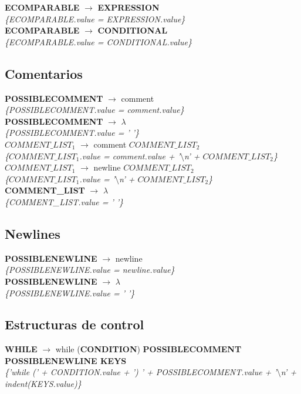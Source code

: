 \documentclass[10pt,a4paper]{article}
\begin{document}
\textbf{ECOMPARABLE} $\rightarrow$ \textbf{EXPRESSION} \\
\textit{\{ECOMPARABLE.value = EXPRESSION.value\}} \\

\textbf{ECOMPARABLE} $\rightarrow$ \textbf{CONDITIONAL} \\
\textit{\{ECOMPARABLE.value = CONDITIONAL.value\}} \\


\subsection{Comentarios}

\textbf{POSSIBLECOMMENT} $\rightarrow$ comment \\
\textit{\{POSSIBLECOMMENT.value = comment.value\}} \\

\textbf{POSSIBLECOMMENT} $\rightarrow$ $\lambda$ \\
\textit{\{POSSIBLECOMMENT.value = ' '\}} \\

\textbf{$COMMENT\_LIST_{1}$} $\rightarrow$ comment \textbf{$COMMENT\_LIST_{2}$} \\
\textit{\{$COMMENT\_LIST_{1}$.value = comment.value + '$\setminus$n' + $COMMENT\_LIST_{2}$\}} \\

\textbf{$COMMENT\_LIST_{1}$} $\rightarrow$ newline \textbf{$COMMENT\_LIST_{2}$} \\
\textit{\{$COMMENT\_LIST_{1}$.value = '$\setminus$n' + $COMMENT\_LIST_{2}$\}} \\

\textbf{COMMENT\_LIST} $\rightarrow$ $\lambda$ \\
\textit{\{COMMENT\_LIST.value = ' '\}} \\

\subsection{Newlines}
\textbf{POSSIBLENEWLINE} $\rightarrow$ newline \\
\textit{\{POSSIBLENEWLINE.value = newline.value\}} \\

\textbf{POSSIBLENEWLINE} $\rightarrow$ $\lambda$ \\
\textit{\{POSSIBLENEWLINE.value = ' '\}} \\


\subsection{Estructuras de control}
\textbf{WHILE} $\rightarrow$ while (\textbf{CONDITION}) \textbf{POSSIBLECOMMENT POSSIBLENEWLINE KEYS} \\
\textit{\{'while (' + CONDITION.value + ') ' + POSSIBLECOMMENT.value + '$\setminus$n' + indent(KEYS.value)\}} \\
\end{document}
